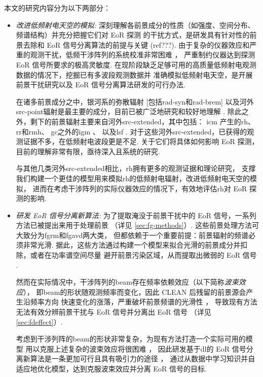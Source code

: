 本文的研究内容分为以下两部分：
\begin{itemize}
\item
\emph{改进低频射电天空的模拟:}
深刻理解各前景成分的性质（如强度、空间分布、频谱结构）并充分把握它们对 EoR 探测
的干扰方式，是研发具有针对性的前景去除和 EoR 信号分离算法的前提与关键 (ref???).
由于复杂的仪器效应和严重的观测干扰，低频干涉阵列的系统校准非常困难
\cite{noordam2004,intema2009,wijnholds2010,barry2016,gehlot2018}，
严重制约仪器达到探测 EoR 信号所要求的极高灵敏度.
在现阶段缺乏足够可用的高质量低频射电观测数据的情况下，挖掘已有多波段观测数据并
准确模拟低频射电天空，是开展前景干扰研究以及 EoR 信号分离算法研发的可行办法.

\hspace{2\ccwd}%
在诸多前景成分之中，银河系的弥散辐射 [包括\ac{rad-syn}和\ac{rad-brem}]
以及河外\ac{src-point}辐射是最主要的成分，目前已被广泛地研究和较好地理解
\cite{shaver1999,diMatteo2004,gleser2008,liu2012,murray2017,spinelli2018}.
除此之外，剩下的前景辐射主要来自河外\ac{src-extended}，其中包括：
\ac{icm} \cite{feretti2012} 产生的\ac{rh}、\ac{rr}和\ac{rmh}、
\ac{gc}之外的\ac{igm} \cite{keshet2004}、
以及\ac{lsf} \cite{vazza2015}.
对于这些河外\ac{src-extended}，已获得的观测证据不多，在低频射电波段更是不足.
关于它们将具体如何影响 EoR 探测，目前的理解非常有限，亟待深入且系统的研究.

\hspace{2\ccwd}%
与其他几类河外\ac{src-extended}相比，\ac{rh}拥有更多的观测证据和理论研究，
支撑我们构建一个更佳的模型用来模拟\ac{rh}的低频射电辐射，改进低频射电天空的模拟，
进而在考虑干涉阵列的实际仪器效应的情况下，有效地评估\ac{rh}对 EoR 探测的影响.

\item
\emph{研发 EoR 信号分离新算法:}
为了提取淹没于前景干扰中的 EoR 信号，一系列方法已被提出来用于处理前景
（详见 \autoref{sec:fg-methods}）.
这些前景处理方法可大致分为\ac{fgrm}和\ac{fgavd}两大类，
但都依赖于一个重要前提：前景辐射的频谱必须非常光滑.
据此，这些方法通过构建一个模型来拟合光滑的前景成分并扣除，或者在功率谱空间尽量
避开前景污染区域，从而提取出微弱的 EoR 信号 \cite{chapman2016}.

\hspace{2\ccwd}%
然而在实际情况中，干涉阵列的\ac{beam}存在频率依赖效应（以下简称\emph{波束效应}），
即\ac{beam}的形状随观测频率而变化，因此 CLEAN 后残留的前景源会产生沿频率方向
快速变化的涨落，严重破坏前景频谱的光滑性 \cite{liu2009ps}，
导致现有方法无法有效分辨前景干扰与 EoR 信号并分离出 EoR 信号
（详见 \autoref{sec:fdeffect}）.

\hspace{2\ccwd}%
考虑到干涉列阵的\ac{beam}的形状非常复杂，为现有方法打造一个实际可用的模型
用以克服上述复杂的波束效应将很困难 \cite{lochner2015}，
因此研发基于\ac{dl}的 EoR 信号分离新算法是一条更加可行且具有吸引力的途径
\cite{herbel2018,vafaeiSadr2019}，
通过从数据中学习知识并自适应地优化模型，达到克服波束效应并分离 EoR 信号的目标.

\end{itemize}


